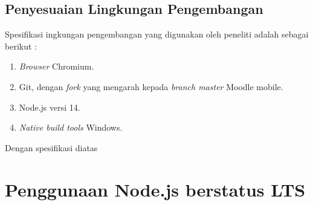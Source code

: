 \subsection{Penyesuaian Lingkungan Pengembangan}
Spesifikasi ingkungan pengembangan yang digunakan oleh peneliti adalah sebagai berikut :

\begin{enumerate}
	\item \textit{Browser} Chromium.
	\item Git, dengan \textit{fork} yang mengarah kepada \textit{branch master} Moodle mobile.
	\item Node.js versi 14.
	\item \textit{Native build tools} Windows.
\end{enumerate} 

Dengan spesifikasi diatas

\section{Penggunaan Node.js berstatus LTS}